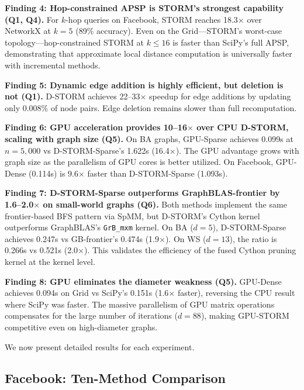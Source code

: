 \documentclass[journal]{IEEEtran}
\begin{document}
\textbf{Finding 4: Hop-constrained APSP is STORM's strongest capability (Q1, Q4).} For $k$-hop queries on Facebook, STORM reaches 18.3$\times$ over NetworkX at $k=5$ (89\% accuracy). Even on the Grid---STORM's worst-case topology---hop-constrained STORM at $k \leq 16$ is faster than SciPy's full APSP, demonstrating that approximate local distance computation is universally faster with incremental methods.

\textbf{Finding 5: Dynamic edge addition is highly efficient, but deletion is not (Q1).} D-STORM achieves 22--33$\times$ speedup for edge additions by updating only 0.008\% of node pairs. Edge deletion remains slower than full recomputation.

\textbf{Finding 6: GPU acceleration provides 10--16$\times$ over CPU D-STORM, scaling with graph size (Q5).} On BA graphs, GPU-Sparse achieves 0.099s at $n=5{,}000$ vs D-STORM-Sparse's 1.622s (16.4$\times$). The GPU advantage grows with graph size as the parallelism of GPU cores is better utilized. On Facebook, GPU-Dense (0.114s) is 9.6$\times$ faster than D-STORM-Sparse (1.093s).

\textbf{Finding 7: D-STORM-Sparse outperforms GraphBLAS-frontier by 1.6--2.0$\times$ on small-world graphs (Q6).} Both methods implement the same frontier-based BFS pattern via SpMM, but D-STORM's Cython kernel outperforms GraphBLAS's \texttt{GrB\_mxm} kernel. On BA ($d=5$), D-STORM-Sparse achieves 0.247s vs GB-frontier's 0.474s (1.9$\times$). On WS ($d=13$), the ratio is 0.266s vs 0.521s (2.0$\times$). This validates the efficiency of the fused Cython pruning kernel at the kernel level.

\textbf{Finding 8: GPU eliminates the diameter weakness (Q5).} GPU-Dense achieves 0.094s on Grid vs SciPy's 0.151s (1.6$\times$ faster), reversing the CPU result where SciPy was faster. The massive parallelism of GPU matrix operations compensates for the large number of iterations ($d=88$), making GPU-STORM competitive even on high-diameter graphs.

We now present detailed results for each experiment.

\subsection{Facebook: Ten-Method Comparison}
\end{document}
